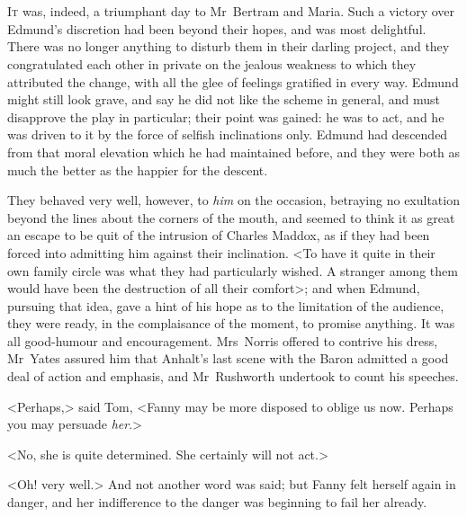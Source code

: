 \chapter[Chapter \thechapter]{} 

 \lettrine[lraise=0.3]{I}{t} was, indeed, a triumphant day to Mr~Bertram and Maria. Such a victory over Edmund's discretion had been beyond their hopes, and was most delightful. There was no longer anything to disturb them in their darling project, and they congratulated each other in private on the jealous weakness to which they attributed the change, with all the glee of feelings gratified in every way. Edmund might still look grave, and say he did not like the scheme in general, and must disapprove the play in particular; their point was gained: he was to act, and he was driven to it by the force of selfish inclinations only. Edmund had descended from that moral elevation which he had maintained before, and they were both as much the better as the happier for the descent.

They behaved very well, however, to \textit{him}  on the occasion, betraying no exultation beyond the lines about the corners of the mouth, and seemed to think it as great an escape to be quit of the intrusion of Charles Maddox, as if they had been forced into admitting him against their inclination. <To have it quite in their own family circle was what they had particularly wished. A stranger among them would have been the destruction of all their comfort>; and when Edmund, pursuing that idea, gave a hint of his hope as to the limitation of the audience, they were ready, in the complaisance of the moment, to promise anything. It was all good-humour and encouragement. Mrs~Norris offered to contrive his dress, Mr~Yates assured him that Anhalt's last scene with the Baron admitted a good deal of action and emphasis, and Mr~Rushworth undertook to count his speeches.

<Perhaps,> said Tom, <Fanny may be more disposed to oblige us now. Perhaps you may persuade \textit{her}.>

<No, she is quite determined. She certainly will not act.>

<Oh! very well.> And not another word was said; but Fanny felt herself again in danger, and her indifference to the danger was beginning to fail her already.

